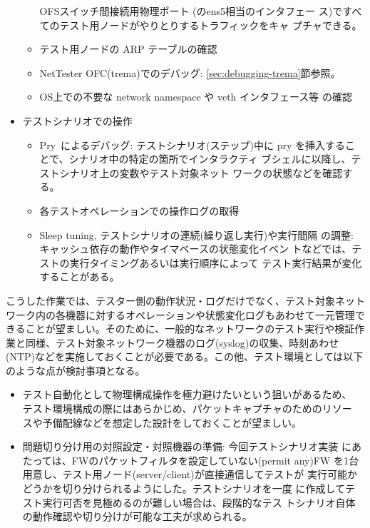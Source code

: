 \begin{itemize}
\begin{itemize}
              OFSスイッチ間接続用物理ポート
              (のens5相当のインタフェー
              ス)ですべてのテスト用ノードがやりとりするトラフィックをキャ
              プチャできる。
        \item テスト用ノードの ARP テーブルの確認
        \item NetTester OFC(trema)でのデバッグ:
              \ref{sec:debugging-trema}節参照。
        \item OS上での不要な network namespace や veth インタフェース等
              の確認
       \end{itemize}
 \item テストシナリオでの操作
       \begin{itemize}
        \item Pry~\cite{pry}によるデバッグ: テストシナリオ(ステップ)中に
              pry を挿入することで、シナリオ中の特定の箇所でインタラクティ
              ブシェルに以降し、テストシナリオ上の変数やテスト対象ネット
              ワークの状態などを確認する。
        \item 各テストオペレーションでの操作ログの取得
        \item Sleep tuning, テストシナリオの連続(繰り返し実行)や実行間隔
              の調整: キャッシュ依存の動作やタイマベースの状態変化イベン
              トなどでは、テストの実行タイミングあるいは実行順序によって
              テスト実行結果が変化することがある。
       \end{itemize}
\end{itemize}

こうした作業では、テスター側の動作状況・ログだけでなく、テスト対象ネット
ワーク内の各機器に対するオペレーションや状態変化ログもあわせて一元管理で
きることが望ましい。そのために、一般的なネットワークのテスト実行や検証作
業と同様、テスト対象ネットワーク機器のログ(syslog)の収集、時刻あわせ
(NTP)などを実施しておくことが必要である。この他、テスト環境としては以下
のような点が検討事項となる。
\begin{itemize}
 \item テスト自動化として物理構成操作を極力避けたいという狙いがあるため、
       テスト環境構成の際にはあらかじめ、パケットキャプチャのためのリソー
       スや予備配線などを想定した設計をしておくことが望ましい。
 \item 問題切り分け用の対照設定・対照機器の準備: 今回テストシナリオ実装
       にあたっては、FWのパケットフィルタを設定していない(permit any)FW
       を1台用意し、テスト用ノード(server/client)が直接通信してテストが
       実行可能かどうかを切り分けられるようにした。テストシナリオを一度
       に作成してテスト実行可否を見極めるのが難しい場合は、段階的なテス
       トシナリオ自体の動作確認や切り分けが可能な工夫が求められる。
\end{itemize}

